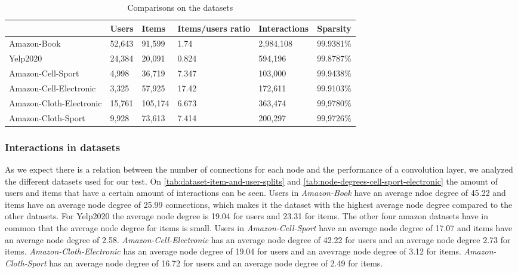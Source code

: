 \begin{table*}[]
    \centering
    \begin{tabular}{|l|l|l|l|l|l|}
        \hline
                                & Users  & Items   & Items/users ratio & Interactions & Sparsity  \\ \hline
        Amazon-Book             & 52,643 & 91,599  & 1.74              & 2,984,108    & 99.9381\% \\ \hline
        Yelp2020                & 24,384 & 20,091  & 0.824             & 594,196      & 99.8787\% \\ \hline
        Amazon-Cell-Sport       & 4,998  & 36,719  & 7.347             & 103,000      & 99.9438\% \\ \hline
        Amazon-Cell-Electronic  & 3,325  & 57,925  & 17.42             & 172,611      & 99.9103\% \\ \hline
        Amazon-Cloth-Electronic & 15,761 & 105,174 & 6.673             & 363,474      & 99,9780\% \\ \hline
        Amazon-Cloth-Sport      & 9,928  & 73,613  & 7.414             & 200,297      & 99,9726\% \\ \hline
    \end{tabular}
    \caption{Comparisons on the datasets}
    \label{tab:dataset-comparison}
\end{table*}

\subsubsection{Interactions in datasets}
As we expect there is a relation between the number of connections for each node and the performance of a convolution layer, we analyzed the different datasets used for our test.
On \autoref{tab:dataset-item-and-user-splits} and \autoref{tab:node-degrees-cell-sport-electronic} the amount of users and items that have a certain amount of interactions can be seen.
Users in \textit{Amazon-Book} have an average ndoe degree of 45.22 and items have an average node degree of 25.99 connections, which makes it the dataset with the highest average node degree compared to the other datasets.
For Yelp2020 the average node degree is 19.04 for users and 23.31 for items.
The other four amazon datasets have in common that the average node degree for items is small.
Users in \textit{Amazon-Cell-Sport} have an average node degree of 17.07 and items have an average node degree of 2.58.
\textit{Amazon-Cell-Electronic} has an average node degree of 42.22 for users and an average node degree 2.73 for items.
\textit{Amazon-Cloth-Electronic} has an average node degree of 19.04 for users and an avevrage node degree of 3.12 for items.
\textit{Amazon-Cloth-Sport} has an average node degree of 16.72 for users and an average node degree of 2.49 for items.


